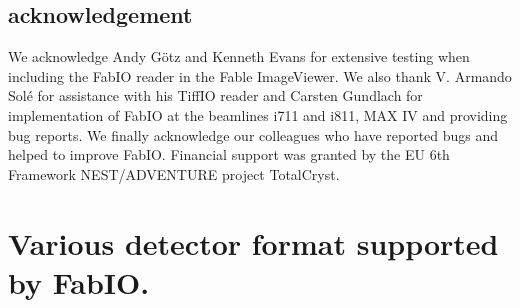 \documentclass{iucr}
\begin{document}
\subsection{acknowledgement}
We acknowledge Andy G\"otz and Kenneth Evans for extensive testing when including
the FabIO reader in the Fable ImageViewer.
We also thank V. Armando Sol\'e for assistance with his TiffIO reader and
Carsten Gundlach for implementation of FabIO at the beamlines i711 and i811, MAX IV and providing bug reports.
We finally acknowledge our colleagues who have reported bugs and helped to
improve FabIO.
Financial support was granted by the EU 6th Framework NEST/ADVENTURE project
TotalCryst.





\appendix
\section{Various detector format supported by FabIO.}
\onecolumn
\end{document}
